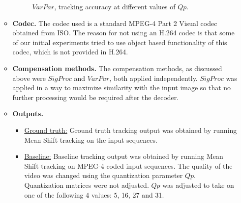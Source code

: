 \documentclass{article}
\begin{document}
\begin{itemize}
\begin{itemize}
\begin{figure}[t]
				\caption{$VarPar$, tracking accuracy at different values of $Qp$.}
				\label{fig:3D}
			\end{figure}

\item \textbf{Codec.}  The codec used is a standard MPEG-4 Part 2 Visual codec obtained from ISO.  The reason for not using an H.264 codec is that some of our initial experiments tried to use object based functionality of this codec, which is not provided in H.264.  
\item \textbf{Compensation methods.}  The compensation methods, as discussed above were $SigProc$ and $VarPar$, both applied independently.  $SigProc$ was applied in a way to maximize similarity with the input image so that no further processing would be required after the decoder.
\item \textbf{Outputs.}
\begin{itemize}
\item \underline{Ground truth:}  Ground truth tracking output was obtained by running Mean Shift tracking on the input sequences.
\item \underline{Baseline:}  Baseline tracking output was obtained by running Mean Shift tracking on MPEG-4 coded input sequences.  The quality of the video was changed using the quantization parameter $Qp$.  Quantization matrices were not adjusted.  $Qp$ was adjusted to take on one of the following 4 values: 5, 16, 27 and 31.  

\end{itemize}
\end{itemize}
\end{itemize}
\end{document}
